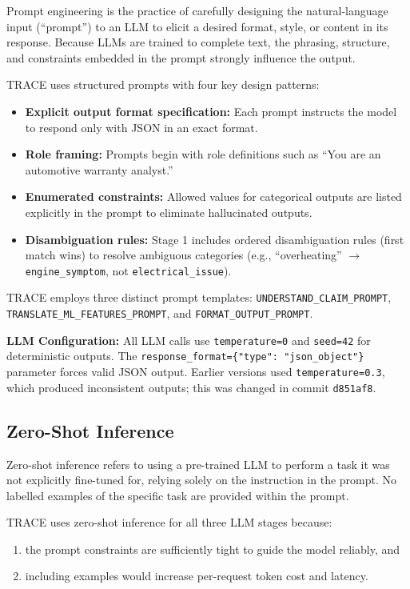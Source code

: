 \documentclass[10pt]{article}
\begin{document}
Prompt engineering is the practice of carefully designing the natural-language input (``prompt'') to an LLM to elicit a desired format, style, or content in its response. Because LLMs are trained to complete text, the phrasing, structure, and constraints embedded in the prompt strongly influence the output.

TRACE uses structured prompts with four key design patterns:

\begin{itemize}
    \item \textbf{Explicit output format specification:} Each prompt instructs the model to respond only with JSON in an exact format.
    \item \textbf{Role framing:} Prompts begin with role definitions such as ``You are an automotive warranty analyst.''
    \item \textbf{Enumerated constraints:} Allowed values for categorical outputs are listed explicitly in the prompt to eliminate hallucinated outputs.
    \item \textbf{Disambiguation rules:} Stage 1 includes ordered disambiguation rules (first match wins) to resolve ambiguous categories (e.g., ``overheating'' $\rightarrow$ \texttt{engine\_symptom}, not \texttt{electrical\_issue}).
\end{itemize}

TRACE employs three distinct prompt templates: \texttt{UNDERSTAND\_CLAIM\_PROMPT}, \texttt{TRANSLATE\_ML\_FEATURES\_PROMPT}, and \texttt{FORMAT\_OUTPUT\_PROMPT}.

\textbf{LLM Configuration:} All LLM calls use \texttt{temperature=0} and \texttt{seed=42} for deterministic outputs. The \texttt{response\_format=\{"type": "json\_object"\}} parameter forces valid JSON output. Earlier versions used \texttt{temperature=0.3}, which produced inconsistent outputs; this was changed in commit \texttt{d851af8}.

\subsection{Zero-Shot Inference}

Zero-shot inference refers to using a pre-trained LLM to perform a task it was not explicitly fine-tuned for, relying solely on the instruction in the prompt. No labelled examples of the specific task are provided within the prompt.

TRACE uses zero-shot inference for all three LLM stages because:
\begin{enumerate}
    \item the prompt constraints are sufficiently tight to guide the model reliably, and
    \item including examples would increase per-request token cost and latency.
\end{enumerate}
\end{document}
